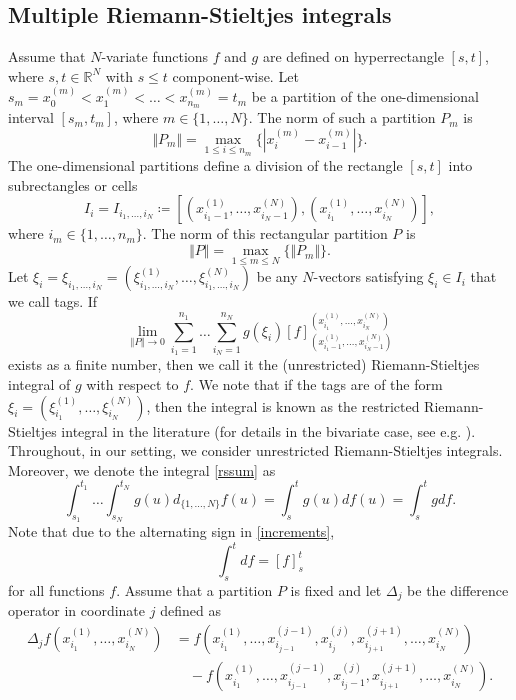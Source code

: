 \documentclass[english, a4paper, 12pt,reqno]{amsart}
\begin{document}
\subsection{Multiple Riemann-Stieltjes integrals}


Assume that $N$-variate functions $f$ and $g$ are defined on hyperrectangle $[s,t]$, where $s,t\in\mathbb{R}^N$ with $s\leq t$ component-wise. Let $s_m = x_0^{(m)} < x_1^{(m)} < \dots < x_{n_m}^{(m)}= t_m$ be a partition of the one-dimensional interval $[s_m,t_m]$, where $m\in\{1,\dots,N\}$. The norm of such a partition $P_m$ is 
$$\Vert P_m \Vert = \max_{1 \leq i \leq n_m}\{|x^{(m)}_i - x^{(m)}_{i-1}|\}.$$  
The one-dimensional partitions define a division of the rectangle $[s,t]$ into subrectangles or cells
$$I_i = I_{i_1,\dots, i_N} \coloneqq [(x^{(1)}_{i_1-1}, \dots, x^{(N)}_{i_N-1}),(x^{(1)}_{i_1}, \dots, x^{(N)}_{i_N})], $$
where $i_m\in\{1,\dots,n_m\}$.
The norm of this rectangular partition $P$ is 
$$\Vert P \Vert = \max_{1\leq m \leq N} \{\Vert P_m \Vert\}.$$
Let $\xi_i = \xi_{i_1,\dots,i_N} = (\xi^{(1)}_{i_1,\dots,i_N}, \dots, \xi^{(N)}_{i_1,\dots,i_N})$ be any $N$-vectors satisfying $\xi_i \in I_i$ that we call tags. If
\begin{equation}
\label{rssum}
\lim_{\Vert P \Vert\to 0} \sum_{i_1 = 1}^{n_1}\dots\sum_{i_N = 1}^{n_N} g(\xi_i)[f]_{(x^{(1)}_{i_1-1}, \dots, x^{(N)}_{i_N-1})}^{(x^{(1)}_{i_1}, \dots, x^{(N)}_{i_N})}
\end{equation}
exists as a finite number, then we call it the (unrestricted) Riemann-Stieltjes integral of $g$ with respect to $f$. We note that if the 
tags are of the form $\xi_i = (\xi^{(1)}_{i_1}, \dots,\xi^{(N)}_{i_N}) $, then the integral is known as the restricted Riemann-Stieltjes integral in the literature (for details in the bivariate case, see e.g. \cite{sard1963linear}). Throughout, in our setting, we consider unrestricted Riemann-Stieltjes integrals. Moreover, we denote the integral \eqref{rssum} as
\begin{equation*}
\int_{s_1}^{t_1} \dots \int_{s_N}^{t_N} g(u)   d_{\{1,\dots,N\}}f(u) = \int_s^t g(u) df(u) = \int_s^t g df.
\end{equation*}
Note that due to the alternating sign in \eqref{increments},
$$\int_s^t df = [f]_s^t$$
for all functions $f$.
Assume that a partition $P$ is fixed and let $\Delta_j$ be the difference operator in coordinate $j$ defined as
\begin{equation*}
\begin{split}
\Delta_j f(x^{(1)}_{i_1}, \dots, x^{(N)}_{i_N})
&= f(x^{(1)}_{i_1}, \dots, x^{(j-1)}_{i_{j-1}}, x^{(j)}_{i_j}, x^{(j+1)}_{i_{j+1}},\dots, x^{(N)}_{i_N})\\
&\quad - f(x^{(1)}_{i_1}, \dots,x^{(j-1)}_{i_{j-1}}, x^{(j)}_{i_j-1}, x^{(j+1)}_{i_{j+1}},\dots, x^{(N)}_{i_N}).
\end{split}
\end{equation*}
\end{document}
